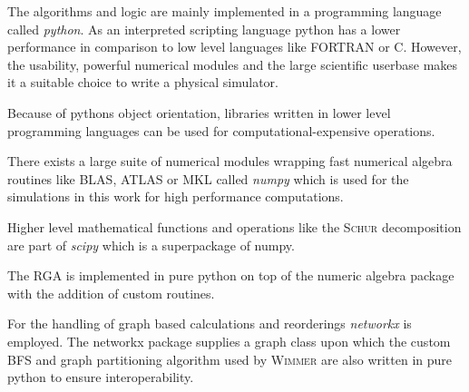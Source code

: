 The algorithms and logic are mainly implemented in a programming language called \emph{python}. As an interpreted scripting language python has a lower performance in comparison to low level languages like FORTRAN or C. However, the usability, powerful numerical modules and the large scientific userbase makes it a suitable choice to write a physical simulator.\par
Because of pythons object orientation, libraries written in lower level programming languages can be used for computational-expensive operations.\par
There exists a large suite of numerical modules wrapping fast numerical algebra routines like BLAS, ATLAS or MKL called \emph{numpy} \cite{numpy} which is used for the simulations in this work for high performance computations.\par
Higher level mathematical functions and operations like the \textsc{Schur} decomposition are part of \emph{scipy} \cite{scipy} which is a superpackage of numpy.\par
The RGA is implemented in pure python on top of the numeric algebra package with the addition of custom routines.\par
For the handling of graph based calculations and reorderings \emph{networkx} \cite{networkx} is employed. The networkx package supplies a graph class upon which the custom BFS and graph partitioning algorithm used by \textsc{Wimmer} are also written in pure python to ensure interoperability.
